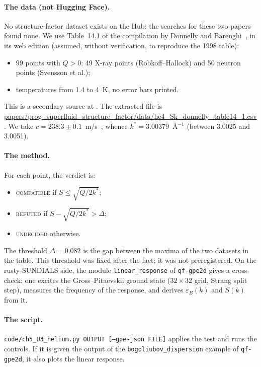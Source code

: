 \paragraph{The data (not Hugging Face).} No structure-factor dataset exists on the Hub: the
searches for these two papers found none. We use Table~14.1 of the compilation by Donnelly and
Barenghi~\cite{ch3-db}, in its web edition (assumed, without verification, to reproduce the 1998 table):
\begin{itemize}
\item 99 points with $Q>0$: 49 X-ray points (Robkoff--Hallock) and 50 neutron points (Svensson et al.);
\item temperatures from 1.4 to 4~K, no error bars printed.
\end{itemize}
This is a secondary source at \tierL{}. The extracted file is
\url{papers/prog_superfluid_structure_factor/data/he4_Sk_donnelly_table14_1.csv}. We take
$c=238.3\pm0.1$~m/s~\cite{ch3-godfrin}, whence $k^*=3.00379$~\AA$^{-1}$ (between 3.0025 and 3.0051).

\paragraph{The method.} For each point, the verdict is:
\begin{itemize}
\item \textsc{compatible} if $S\le\sqrt{Q/2k^*}$;
\item \textsc{refuted} if $S-\sqrt{Q/2k^*}>\Delta$;
\item \textsc{undecided} otherwise.
\end{itemize}
The threshold $\Delta=0.082$ is the gap between the maxima of the two datasets in the table. This threshold was fixed after the fact; it
was not preregistered. On the rusty-SUNDIALS side, the module \texttt{linear\_response} of \texttt{qf-gpe2d} gives a
cross-check: one excites the Gross--Pitaevskii ground state ($32\times32$ grid, Strang split step),
measures the frequency of the response, and derives $\varepsilon_B(k)$ and $S(k)$ from it.

\paragraph{The script.} \texttt{code/ch5\_U3\_helium.py OUTPUT [--gpe-json FILE]} applies the test and runs the
controls. If it is given the output of the \texttt{bogoliubov\_dispersion} example of \texttt{qf-gpe2d}, it also plots
the linear response.

